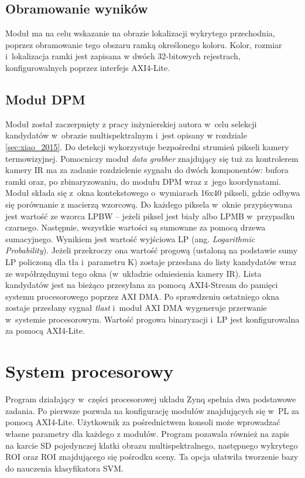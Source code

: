 \subsection{Obramowanie wyników}

Moduł ma na celu wskazanie na obrazie lokalizacji wykrytego przechodnia, poprzez obramowanie tego obszaru ramką określonego koloru. Kolor, rozmiar i~lokalizacja ramki jest zapisana w dwóch 32-bitowych rejestrach, konfigurowalnych poprzez interfejs AXI4-Lite.

\subsection{Moduł DPM}

Moduł został zaczerpnięty z pracy inżynierskiej autora w~celu selekcji kandydatów w~obrazie multispektralnym i~jest opisany w rozdziale \ref {sec:xiao_2015}. 
Do detekcji wykorzystuje bezpośredni strumień pikseli kamery termowizyjnej. 
Pomocniczy moduł \textit{data grabber} znajdujący się tuż za kontrolerem kamery IR ma za zadanie rozdzielenie sygnału do dwóch komponentów: bufora ramki oraz, po zbinaryzowaniu, do modułu DPM wraz z~jego koordynatami. 
Moduł składa się z~okna kontekstowego o~wymiarach 16x40 pikseli, gdzie odbywa się porównanie z macierzą wzorcową. 
Do każdego piksela w~oknie przypisywana jest wartość ze wzorca LPBW -- jeżeli piksel jest biały albo LPMB w~przypadku czarnego. 
Następnie, wszystkie wartości są sumowane za pomocą drzewa sumacyjnego. Wynikiem jest wartość wyjściowa LP (ang. \textit{Logarithmic Probability}). 
Jeżeli przekroczy ona wartość progową (ustaloną na podstawie sumy LP policzoną dla tła i~parametru K) zostaje przesłana do listy kandydatów wraz ze współrzędnymi tego okna (w~układzie odniesienia kamery IR).
Lista kandydatów jest na bieżąco przesyłana za pomocą AXI4-Stream do pamięci systemu procesorowego poprzez AXI DMA. 
Po sprawdzeniu ostatniego okna zostaje przesłany sygnał \textit{tlast} i~moduł AXI DMA wygeneruje przerwanie w~systemie procesorowym. 
Wartość progowa binaryzacji i~LP jest konfigurowalna za pomocą AXI4-Lite.

\section{System procesorowy}

Program działający w~części procesorowej układu Zynq spełnia dwa podstawowe zadania. 
Po pierwsze pozwala na konfigurację modułów znajdujących się w~PL za pomocą AXI4-Lite. 
Użytkownik za pośrednictwem konsoli może wprowadzać własne parametry dla każdego z modułów. 
Program pozawala również na zapis na karcie SD pojedynczej klatki obrazu multispektralnego, następnego wykrytego ROI oraz ROI znajdującego się pośrodku sceny. 
Ta opcja ułatwiła tworzenie bazy do nauczenia klasyfikatora SVM.


